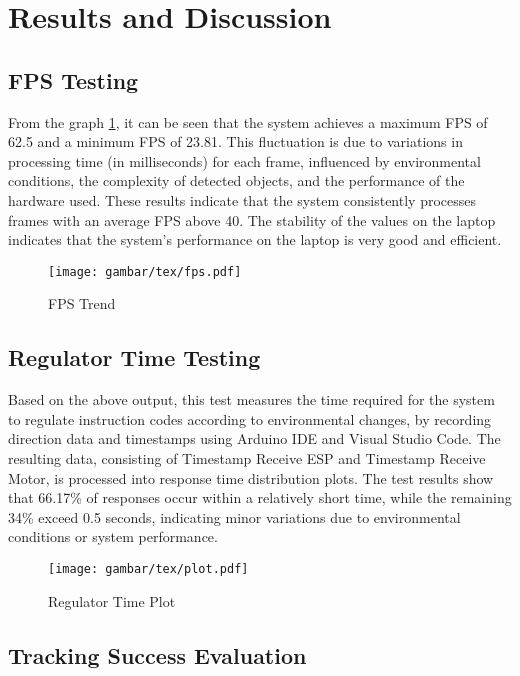 \section{Results and Discussion}
\label{sec:resultsanddiscussion}

\subsection{FPS Testing}

From the graph \ref{fig:fps_trend}, it can be seen that the system achieves a maximum FPS of 62.5 and a minimum FPS of 23.81. This fluctuation is due to variations in processing time (in milliseconds) for each frame, influenced by environmental conditions, the complexity of detected objects, and the performance of the hardware used.
These results indicate that the system consistently processes frames with an average FPS above 40. The stability of the values on the laptop indicates that the system's performance on the laptop is very good and efficient.

\begin{figure}[H]
    \centering
    \texttt{[image: gambar/tex/fps.pdf]}
    \caption{FPS Trend}
    \label{fig:fps_trend}
\end{figure}

\subsection{Regulator Time Testing}
Based on the above output, this test measures the time required for the system to regulate instruction codes according to environmental changes, by recording direction data and timestamps using Arduino IDE and Visual Studio Code. The resulting data, consisting of Timestamp Receive ESP and Timestamp Receive Motor, is processed into response time distribution plots. The test results show that 66.17\% of responses occur within a relatively short time, while the remaining 34\% exceed 0.5 seconds, indicating minor variations due to environmental conditions or system performance.

\begin{figure}[H]
    \centering
    \texttt{[image: gambar/tex/plot.pdf]}
    \caption{Regulator Time Plot}
    \label{fig:regulator_time_plot}
\end{figure}

\subsection{Tracking Success Evaluation}
\label{subsec:trackingsuccessevaluation}

